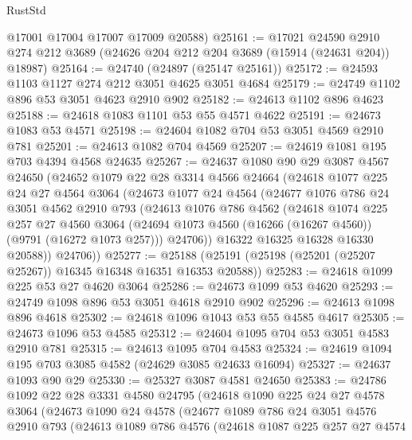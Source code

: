 \begin{lexlean}{RustStd}
\begin{coremodule}
      @17001
      @17004
      @17007
      @17009
      @20588)
@25161 := @17021
    @24590
    @2910
    @274
    @212
    @3689
    (@24626 @204 @212 @204 @3689 (@15914 (@24631 @204)) @18987)
@25164 := @24740 (@24897 (@25147 @25161))
@25172 := @24593 @1103 @1127 @274 @212 @3051 @4625 @3051 @4684
@25179 := @24749 @1102 @896 @53 @3051 @4623 @2910 @902
@25182 := @24613 @1102 @896 @4623
@25188 := @24618 @1083 @1101 @53 @55 @4571 @4622
@25191 := @24673 @1083 @53 @4571
@25198 := @24604 @1082 @704 @53 @3051 @4569 @2910 @781
@25201 := @24613 @1082 @704 @4569
@25207 := @24619 @1081 @195 @703 @4394 @4568 @24635
@25267 := @24637
    @1080
    @90
    @29
    @3087
    @4567
    @24650
    (@24652
      @1079
      @22
      @28
      @3314
      @4566
      @24664
      (@24618
        @1077
        @225
        @24
        @27
        @4564
        @3064
        (@24673
          @1077
          @24
          @4564
          (@24677
            @1076
            @786
            @24
            @3051
            @4562
            @2910
            @793
            (@24613
              @1076
              @786
              @4562
              (@24618
                @1074
                @225
                @257
                @27
                @4560
                @3064
                (@24694 @1073 @4560 (@16266 (@16267 @4560)) (@9791 (@16272 @1073 @257)))
                @24706))
            @16322
            @16325
            @16328
            @16330
            @20588))
        @24706))
@25277 := @25188 (@25191 (@25198 (@25201 (@25207 @25267)) @16345 @16348 @16351 @16353 @20588))
@25283 := @24618 @1099 @225 @53 @27 @4620 @3064
@25286 := @24673 @1099 @53 @4620
@25293 := @24749 @1098 @896 @53 @3051 @4618 @2910 @902
@25296 := @24613 @1098 @896 @4618
@25302 := @24618 @1096 @1043 @53 @55 @4585 @4617
@25305 := @24673 @1096 @53 @4585
@25312 := @24604 @1095 @704 @53 @3051 @4583 @2910 @781
@25315 := @24613 @1095 @704 @4583
@25324 := @24619 @1094 @195 @703 @3085 @4582 (@24629 @3085 @24633 @16094)
@25327 := @24637 @1093 @90 @29
@25330 := @25327 @3087 @4581 @24650
@25383 := @24786
    @1092
    @22
    @28
    @3331
    @4580
    @24795
    (@24618
      @1090
      @225
      @24
      @27
      @4578
      @3064
      (@24673
        @1090
        @24
        @4578
        (@24677
          @1089
          @786
          @24
          @3051
          @4576
          @2910
          @793
          (@24613
            @1089
            @786
            @4576
            (@24618
              @1087
              @225
              @257
              @27
              @4574

\end{coremodule}
\end{lexlean}
